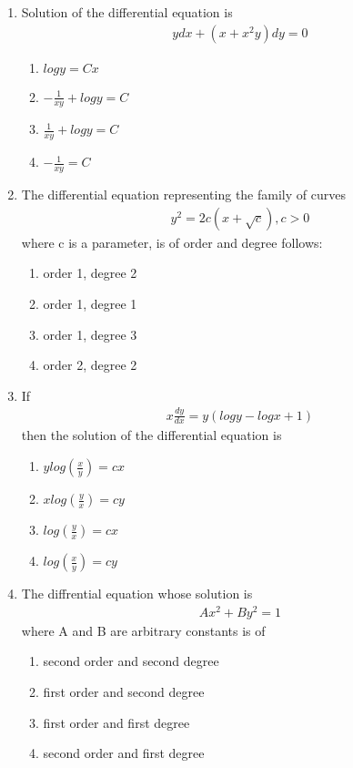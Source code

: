 \begin{enumerate}[label=\arabic*.,ref=\thesubsection.\theenumi]
\item Solution of the differential equation is
\begin{align*}
ydx + (x + x^2y)dy = 0
\end{align*}
\begin{enumerate}
\item $logy = Cx$
\item $-\frac{1}{xy} + log y = C$
\item $\frac{1}{xy} + logy = C$
\item $-\frac{1}{xy} = C$
\end{enumerate}

\item The differential equation representing the family of curves
\begin{align*}
y^2 = 2c(x + \sqrt{c}), c > 0 
\end{align*}
where c is a parameter, is of order and degree follows:
\begin{enumerate}
\item order 1, degree 2
\item order 1, degree 1
\item order 1, degree 3
\item order 2, degree 2
\end{enumerate}

\item If 
\begin{align*}
x\frac{dy}{dx} = y(logy - logx + 1)
\end{align*}
then the solution of the differential equation is
\begin{enumerate}
\item $ylog\left(\frac{x}{y}\right) = cx$
\item $xlog\left(\frac{y}{x}\right) = cy$
\item $log\left(\frac{y}{x}\right) = cx$
\item $log\left(\frac{x}{y}\right) = cy$
\end{enumerate} 

\item The diffrential equation whose solution is
\begin{align}
Ax^2 + By^2 = 1
\end{align}
where A and B are arbitrary constants is of
\begin{enumerate}
\item second order and second degree
\item first order and second degree
\item first order and first degree
\item second order and first degree
\end{enumerate}


\end{enumerate}
